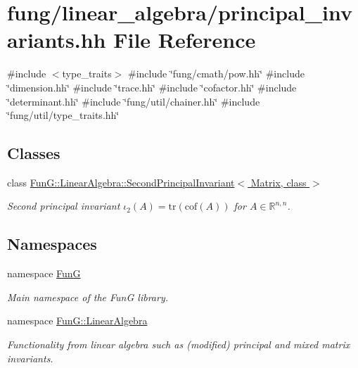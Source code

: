 \hypertarget{principal__invariants_8hh}{\section{fung/linear\-\_\-algebra/principal\-\_\-invariants.hh \-File \-Reference}
\label{principal__invariants_8hh}
}
{\ttfamily \#include $<$type\-\_\-traits$>$}\*
{\ttfamily \#include \char`\"{}fung/cmath/pow.\-hh\char`\"{}}\*
{\ttfamily \#include \char`\"{}dimension.\-hh\char`\"{}}\*
{\ttfamily \#include \char`\"{}trace.\-hh\char`\"{}}\*
{\ttfamily \#include \char`\"{}cofactor.\-hh\char`\"{}}\*
{\ttfamily \#include \char`\"{}determinant.\-hh\char`\"{}}\*
{\ttfamily \#include \char`\"{}fung/util/chainer.\-hh\char`\"{}}\*
{\ttfamily \#include \char`\"{}fung/util/type\-\_\-traits.\-hh\char`\"{}}\*
\subsection*{\-Classes}
\begin{DoxyCompactItemize}
\item 
class \hyperlink{classFunG_1_1LinearAlgebra_1_1SecondPrincipalInvariant}{\-Fun\-G\-::\-Linear\-Algebra\-::\-Second\-Principal\-Invariant$<$ Matrix, class $>$}
\begin{DoxyCompactList}\small\item\em \-Second principal invariant $ \iota_2(A)=\mathrm{tr}(\mathrm{cof}(A)) $ for $A\in\mathbb{R}^{n,n}$. \end{DoxyCompactList}\end{DoxyCompactItemize}
\subsection*{\-Namespaces}
\begin{DoxyCompactItemize}
\item 
namespace \hyperlink{namespaceFunG}{\-Fun\-G}
\begin{DoxyCompactList}\small\item\em \-Main namespace of the \-Fun\-G library. \end{DoxyCompactList}\item 
namespace \hyperlink{namespaceFunG_1_1LinearAlgebra}{\-Fun\-G\-::\-Linear\-Algebra}
\begin{DoxyCompactList}\small\item\em \-Functionality from linear algebra such as (modified) principal and mixed matrix invariants. \end{DoxyCompactList}\end{DoxyCompactItemize}
